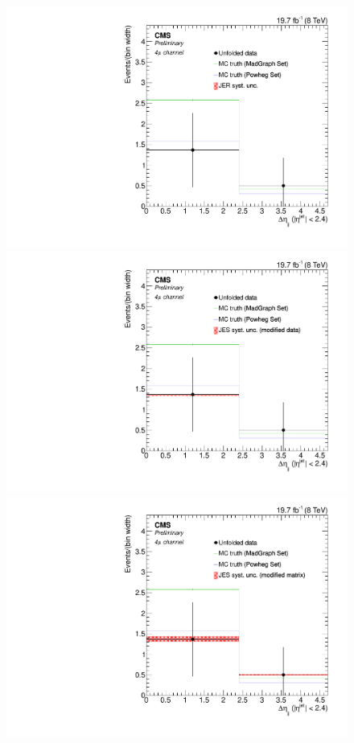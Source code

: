 \begin{figure}[hbtp]
\begin{center}
   \includegraphics[width=0.8\cmsFigWidth]{Figures/Unfolding/Systematics/ZZTo4m_CentralDeta_JER_Mad_fr}
   \includegraphics[width=0.8\cmsFigWidth]{Figures/Unfolding/Systematics/ZZTo4m_CentralDeta_JES_ModData_Mad_fr}     
   \includegraphics[width=0.8\cmsFigWidth]{Figures/Unfolding/Systematics/ZZTo4m_CentralDeta_JES_ModMat_Mad_fr}

\end{center}
\end{figure}
